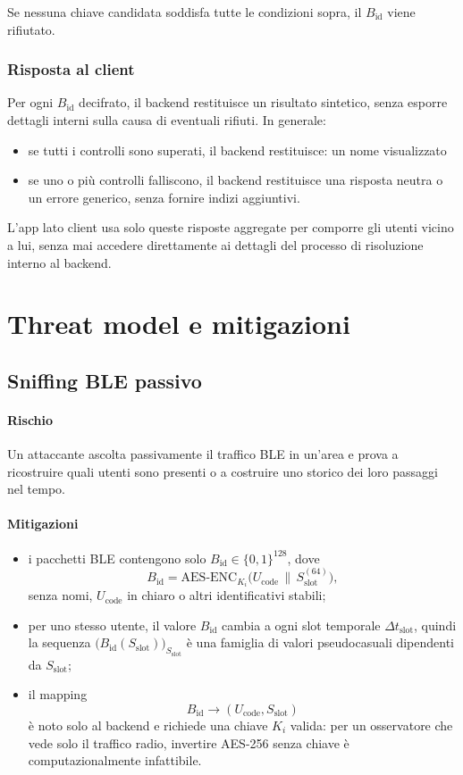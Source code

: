 \documentclass[a4paper,11pt]{article}
\begin{document}
Se nessuna chiave candidata soddisfa tutte le condizioni sopra, il \(B_{\text{id}}\) viene rifiutato.

\subsubsection{Risposta al client}
Per ogni \(B_{\text{id}}\) decifrato, il backend restituisce un risultato sintetico, senza esporre dettagli interni sulla causa di eventuali rifiuti.
In generale:
\begin{itemize}
  \item se tutti i controlli sono superati, il backend restituisce:
        \subitem un nome visualizzato
  \item se uno o più controlli falliscono, il backend restituisce una risposta neutra o un errore generico, senza fornire indizi aggiuntivi.
\end{itemize}

L'app lato client usa solo queste risposte aggregate per comporre gli utenti vicino a lui, senza mai accedere direttamente ai dettagli del processo di risoluzione interno al backend.

\section{Threat model e mitigazioni}
\subsection{Sniffing BLE passivo}
\paragraph{Rischio}
Un attaccante ascolta passivamente il traffico BLE in un’area e prova a ricostruire quali utenti
sono presenti o a costruire uno storico dei loro passaggi nel tempo.

\paragraph{Mitigazioni}
\begin{itemize}
  \item i pacchetti BLE contengono solo \(B_{\text{id}} \in \{0,1\}^{128}\), dove
        \[
          B_{\text{id}} = \mathrm{AES\text{-}ENC}_{K_i}\bigl(U_{\text{code}} \,\|\, S_{\text{slot}}^{(64)}\bigr),
        \]
        senza nomi, \(U_{\text{code}}\) in chiaro o altri identificativi stabili;
  \item per uno stesso utente, il valore \(B_{\text{id}}\) cambia a ogni slot temporale
        \(\Delta t_{\text{slot}}\), quindi la sequenza
        \(\bigl(B_{\text{id}}(S_{\text{slot}})\bigr)_{S_{\text{slot}}}\) è una famiglia
        di valori pseudocasuali dipendenti da \(S_{\text{slot}}\);
  \item il mapping
        \[
          B_{\text{id}} \longrightarrow (U_{\text{code}}, S_{\text{slot}})
        \]
        è noto solo al backend e richiede una chiave \(K_i\) valida:
        per un osservatore che vede solo il traffico radio, invertire AES-256 senza chiave
        è computazionalmente infattibile.
\end{itemize}
\end{document}
